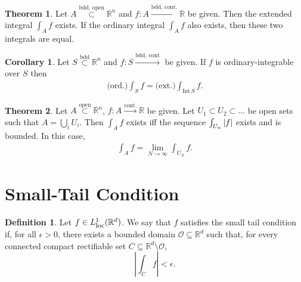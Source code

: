 \documentclass{article}
\theoremstyle{definition}
\newtheorem{defn}{Definition}[section]
\newtheorem{thm}{Theorem}[section]
\newtheorem{cor}{Corollary}[section]
\begin{document}
\begin{thm}
    Let $A \overset{\text{bdd, open}}{\subset} \mathbb{R}^n$ and $f: A \xrightarrow{\text{bdd, cont.}} \mathbb{R}$ be given. Then the extended integral $\int_A f$ exists. If the ordinary integral $\int_A f$ also exists, then these two integrals are equal.
\end{thm}


\begin{cor}
    Let $S \overset{\text{bdd}}{\subset} \mathbb{R}^n$ and $f: S \xrightarrow{\text{bdd, cont}}$ be given. If $f$ is ordinary-integrable over $S$ then 
    \begin{align*}
        \text{(ord.)} \int_S f = \text{(ext.)} \int_{\text{Int}\,S} f.
    \end{align*}
\end{cor}




\begin{thm}
    Let $A \overset{\text{open}}{\subset} \mathbb{R}^n$, $f: A \xrightarrow{\text{cont.}} \mathbb{R}$ be given. Let $U_1 \subset U_2 \subset \dots$ be open sets such that $A = \bigcup_i U_i$. Then $\int_A f$ exists iff the sequence $\int_{U_n}\abs{f}$ exists and is bounded. In this case,
    \begin{align*}
        \int_A f = \lim\limits_{N\to \infty}\int_{U_N}f.
    \end{align*}
\end{thm}












\newpage




\section{Small-Tail Condition}

\begin{defn}
Let $f\in L^1_{\mbox{\footnotesize loc}}(\mathbb{R}^d)$. We say that $f$ satisfies the small tail condition if, for all $\epsilon>0$, there exists a bounded domain $\mathcal{O}\subseteq\mathbb{R}^d$ such that, for every connected compact rectifiable set $C\subseteq \mathbb{R}^d\setminus\mathcal{O}$, 
\begin{equation*}
\left|\int_C f\right|<\epsilon.
\end{equation*}
\end{defn}
\end{document}

